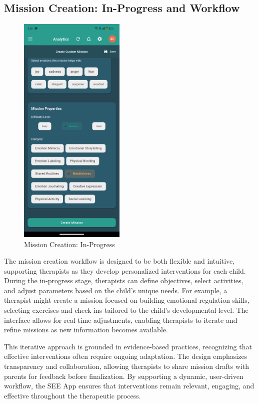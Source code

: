 ﻿\documentclass[12pt,a4paper]{article}
\newcommand{\sectiontitle}[1]{\subsection{#1}}
\begin{document}
\sectiontitle{Mission Creation: In-Progress and Workflow}

\begin{figure}[H]
    \centering
    \includegraphics[width=0.45\textwidth]{Screenshots/middleofmissioncreation.png}
    \caption{Mission Creation: In-Progress}
    \label{fig:middle-mission-creation}
\end{figure}
The mission creation workflow is designed to be both flexible and intuitive, supporting therapists as they develop personalized interventions for each child. During the in-progress stage, therapists can define objectives, select activities, and adjust parameters based on the child's unique needs. For example, a therapist might create a mission focused on building emotional regulation skills, selecting exercises and check-ins tailored to the child's developmental level. The interface allows for real-time adjustments, enabling therapists to iterate and refine missions as new information becomes available.

This iterative approach is grounded in evidence-based practices, recognizing that effective interventions often require ongoing adaptation. The design emphasizes transparency and collaboration, allowing therapists to share mission drafts with parents for feedback before finalization. By supporting a dynamic, user-driven workflow, the SEE App ensures that interventions remain relevant, engaging, and effective throughout the therapeutic process.
\end{document}
